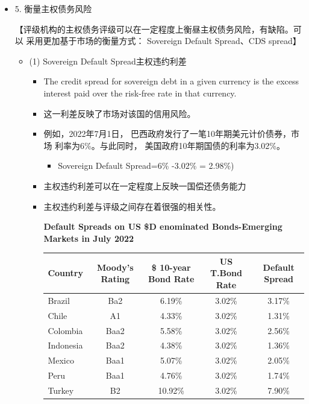 \begin{itemize}
\begin{itemize}
\end{itemize}


\item 5. 衡量主权债务风险

【评级机构的主权债务评级可以在一定程度上衡昼主权债务风险，有缺陷。可以
采用更加基于市场的衡量方式： Sovereign Default Spread、CDS spread】

\begin{itemize}
    \item (1) Sovereign Default Spread主权违约利差
    \begin{itemize}
        \item The credit spread for sovereign debt in a given currency is the excess
        interest paid over the risk-free rate in that currency.
        \item 这一利差反映了市场对该国的信用风险。
        \item  例如，2022年7月1日， 巴西政府发行了一笔10年期美元计价债券，市场
利率为6\%。与此同时， 美国政府10年期国债的利率为3.02\%。
    \begin{itemize}
    \item  Sovereign Default Spread=6\% -3.02\% = 2.98\%)
    \end{itemize}
\item  主权违约利差可以在一定程度上反映一国偿还债务能力
\item  主权违约利差与评级之间存在着很强的相关性。

\begin{center}
    \textbf{Default Spreads on US \$D enominated Bonds-Emerging Markets in July 2022}
    \end{center}
    
    \begin{center}
        {\renewcommand{\arraystretch}{1.5}
        \begin{tabular}{|l|c|c|c|c|}
        \hline
        \textbf{Country} & \textbf{Moody's Rating} & \textbf{\$ 10-year Bond Rate} & \textbf{US T.Bond Rate} & \textbf{Default Spread} \\
        \hline
        Brazil & Ba2 & 6.19\% & 3.02\% & 3.17\% \\
        \hline
        Chile & A1 & 4.33\% & 3.02\% & 1.31\% \\
        \hline
        Colombia & Baa2 & 5.58\% & 3.02\% & 2.56\% \\
        \hline
        Indonesia & Baa2 & 4.38\% & 3.02\% & 1.36\% \\
        \hline
        Mexico & Baa1 & 5.07\% & 3.02\% & 2.05\% \\
        \hline
        Peru & Baa1 & 4.76\% & 3.02\% & 1.74\% \\
        \hline
        Turkey & B2 & 10.92\% & 3.02\% & 7.90\% \\
        \hline
        \end{tabular}}
    \end{center}


\end{itemize}
\end{itemize}
\end{itemize}
